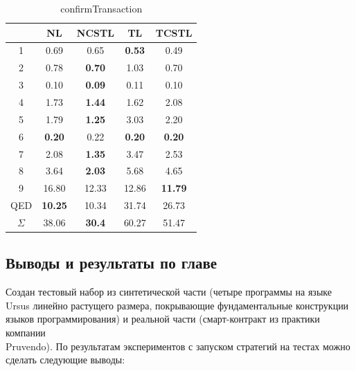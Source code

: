\documentclass[../thesis.tex]{subfiles}
\begin{document}
\begin{table}[h]
\centering
\begin{tabular}{|c|c|c|c|c|}
\hline
\textbf{} & \textbf{NL} & \textbf{NCSTL} & \textbf{TL} & \textbf{TCSTL} \\
\hline
1 & 0.69 & 0.65 & \textbf{0.53} & 0.49 \\
\hline
2 & 0.78 & \textbf{0.70} & 1.03 & 0.70 \\
\hline
3 & 0.10 & \textbf{0.09} & 0.11 & 0.10 \\
\hline
4 & 1.73 & \textbf{1.44} & 1.62 & 2.08 \\
\hline
5 & 1.79 & \textbf{1.25} & 3.03 & 2.20 \\
\hline
6 & \textbf{0.20} & 0.22 & \textbf{0.20} & \textbf{0.20} \\
\hline
7 & 2.08 & \textbf{1.35} & 3.47 & 2.53 \\
\hline
8 & 3.64 & \textbf{2.03} & 5.68 & 4.65 \\
\hline
9 & 16.80 & 12.33 & 12.86 & \textbf{11.79} \\
\hline
QED & \textbf{10.25} & 10.34 & 31.74 & 26.73 \\
\hline
$\Sigma$ & 38.06 & \textbf{30.4} & 60.27	& 51.47 \\
\hline
\end{tabular}
\caption{confirmTransaction}
\label{tab:block3}
\end{table}

\subsection{Выводы и результаты по главе}

Создан тестовый набор из синтетической части (четыре программы на языке Ursus линейно растущего размера, покрывающие фундаментальные конструкции языков программирования) и реальной части (смарт-контракт из практики компании\\Pruvendo). По результатам экспериментов с запуском стратегий на тестах можно сделать следующие выводы:
\end{document}
